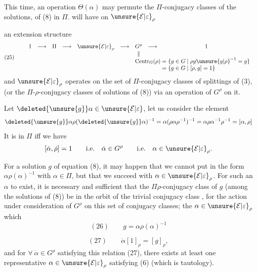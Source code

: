This time, an operation $\Theta(\alpha)$ may permute the $\Pi$-conjugacy classes of the  solutions, of (8) in $\Pi$.
  will have on $\unsure{\mathcal E|\varepsilon}_\rho$


an extension structure
\[
(25)\qquad
\begin{array}{ccccccccc}
1&\longrightarrow&\Pi&\longrightarrow&\unsure{\mathcal E|\varepsilon}_\rho&\longrightarrow&G^\rho&\longrightarrow&1\\
&&&&&&\Vert\\
&&&&&&\multicolumn{3}{l}{\operatorname{Centr}_G(\rho)=\{g\in G\mid\rho g\unsure{g|\rho}^{-1}=g\}}\\
&&&&&&\multicolumn{3}{l}{\phantom{\operatorname{Centr}_G(\rho)}=\{g\in G\mid[\rho,g]=1\}}
\end{array}
\]
and $\unsure{\mathcal E|\varepsilon}_\rho$ operates on the set of $\Pi$-conjugacy classes of splittings of (3), (or the $\Pi$-$\rho$-conjugacy classes of solutions of (8)) via an operation of $G^\rho$ on it.

Let $\deleted{\unsure{g}}\alpha\in\unsure{\mathcal E|\varepsilon}$, let us consider the element
\[
\deleted{\unsure{g}}\alpha\rho(\deleted{\unsure{g}}\alpha)^{-1}
=\alpha(\rho\alpha\rho^{-1})^{-1}
=\alpha\rho\alpha^{-1}\rho^{-1}=[\alpha,\rho]
\]
It is in $\Pi$ iff we have 
\[
[\dot\alpha,\dot\rho]=1\qquad\text{i.e.}\quad
\dot\alpha\in G^\rho\qquad\text{i.e.}\quad\alpha\in\unsure{\mathcal E|\varepsilon}_\rho.
\]

For a solution $g$ of equation (8), it may happen that we cannot put  in the  form $\alpha\rho(\alpha)^{-1}$ with $\alpha\in\Pi$, but that we succeed with $\alpha\in\unsure{\mathcal E|\varepsilon}_\rho$.
For such an $\alpha$ to exist, it is necessary and sufficient that the $\Pi\rho$-conjugacy class \inserted{$[g]_\rho$} of $g$ (among the solutions of (8)) be in the orbit of the trivial conjugacy class \inserted{$[1]_\rho$}, for the action under consideration of $G^\rho$ on this set of conjugacy classes;  the $\alpha\in\unsure{\mathcal E|\varepsilon}_\rho$ which 
\[
(26)\qquad g=\alpha\rho(\alpha)^{-1}
\]


\[
(27)\qquad\dot\alpha[1]_\rho=[g]_\rho,
\]
and for $\forall\ \dot\alpha\in G^\rho$ satisfying this relation (27), there exists at least one representative $\alpha\in\unsure{\mathcal E|\varepsilon}_\rho$ satisfying (6) (which is  tautology).


